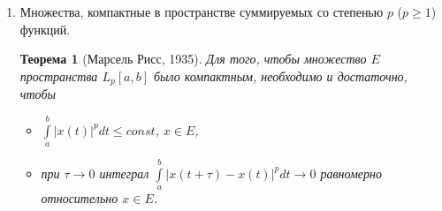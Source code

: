 \documentclass[12pt,a4paper,titlepage,oneside]{book}
\newcommand{\overbar}[1]{\mkern 1.5mu\overline{\mkern-1.5mu#1\mkern-1.5mu}\mkern 1.5mu}
\theoremstyle{definition}
\theoremstyle{plain}
\newtheorem*{theorem}{Теорема}
\theoremstyle{break}
\theoremstyle{remark}
\theoremstyle{remark}
\theoremstyle{remark}
\theoremstyle{remark}
\theoremstyle{plain}
\theoremstyle{plain}
\begin{document}
\begin{enumerate}
\begin{proof}
	Множество $H_{\varepsilon}$ компактно в $C[a, b]$. Действительно, каждая ломаная определяется $n$ числами $(\eta_1, \eta_2,\ldots,\eta_n )$, где все числа $\eta_k$ ограничены: $|\eta_k|\leqslant const$. Из любой последовательности ломаных из $H_{\varepsilon}$ можно образовать фундаментальную подпоследовательность.
	
	Покажем, что компактное множество $H_{\varepsilon}$ образует в $E$ $\varepsilon$-сеть. Для любой функции $x\in E$ построим ломаную $\overbar{x}(t)$, $\overbar{x} \in H_{\varepsilon}$. Так как $x(t)$ непрерывна, то на отрезке $[t_k, t_{k+1}]$ она достигает своего максимального значения $M_k$ и своего минимального значения $m_k$: $m_k \leqslant x(t) \leqslant M_k$, $t \in [t_k, t_{k+1}]$. В этих же пределах лежат и значения линейной функции $\overbar{x}(t)$. Ясно, что $|x(t)-\overbar{x}(t)|\leqslant M_k-m_k$, $t \in [t_k, t_{k+1}]$.
	
	В силу выбора значения $\delta$ величины $M_k-m_k < \varepsilon$. Тогда и $\rho(x, \overbar{x}) < \varepsilon$. Согласно следствию теоремы Хаусдорфа, множество $E$ компактно в $C[a, b]$.
	
	. Свойства функций из компактного множества $E$, указанные в теореме, сразу следуют из существования в $E$ $\underbar {конечной}$ $\varepsilon$-сети непрерывных на $[a, b]$ функций $x_1(t), x_2(t),\ldots,x_N(t)$.
\end{proof}

	\item Множества, компактные в пространстве суммируемых со степенью $p$ ($p \geqslant 1$) функций.

\begin{theorem}[Марсель Рисс, 1935]
Для того, чтобы множество $E$  пространства $L_p[a, b]$ было компактным, необходимо и достаточно, чтобы

\begin{itemize}

	\item $\displaystyle\int\limits_a^b \big \lvert x(t) \big \rvert^p dt \leqslant const$, $x \in E$,

	\item при $\tau \to 0$ интеграл $\displaystyle\int\limits_a^b \big \lvert x(t+\tau)-x(t) \big \rvert^p dt \to 0$ равномерно относительно $x \in E$.

\end{itemize}

\end{theorem}


\end{enumerate}
\end{document}
